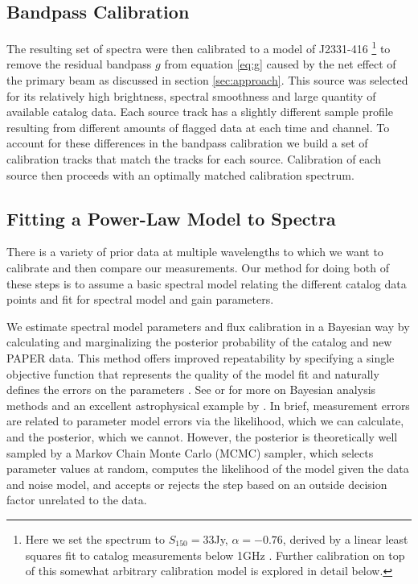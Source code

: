 \documentclass[preprint]{aastex}
\begin{document}
\subsection{Bandpass Calibration}
\label{sec:Calibration}

The resulting set of spectra were then calibrated to a model of J2331-416 
\footnote{Here we set the spectrum to $S_{150}=33$Jy, $\alpha=-0.76$, derived by a linear least squares fit to
catalog measurements below 1GHz \citep{Slee:1995p7541,Kuehr:1981p9628,Large:1981p7798,Burgess:2006p7814}.  Further calibration on top of this somewhat arbitrary calibration model
is explored in detail below. }
 to remove 
the residual bandpass $g$ from equation \ref{eq:g} caused by the net effect of the primary beam as discussed in section \ref{sec:approach}. 
This source
was selected for its relatively high brightness, spectral smoothness and large quantity
 of available catalog data. Each source track has a slightly different sample profile
 resulting from different amounts of flagged data at each time and channel. To account
 for these differences in the bandpass calibration we build a set of calibration tracks 
 that match the tracks for each source. Calibration of each source then proceeds with
 an optimally matched calibration spectrum.


\subsection{Fitting a Power-Law Model to Spectra}
\label{sec:mcmc}

There is a variety of prior data at multiple wavelengths to which we want to calibrate
and then compare our measurements.  Our method for doing both of these steps
is to assume a basic spectral model relating the different catalog data points and
fit for spectral model and gain parameters. 

We estimate spectral model parameters and flux calibration in a
Bayesian way by calculating and marginalizing the posterior probability of the
catalog and new PAPER data.   This method
offers improved repeatability by specifying a single objective function that
represents the quality of the model fit and naturally defines the errors on the
parameters \citep{Hogg:2010p8759}.   See  \citet{Mackay:2003p9717}  or
\citet{Sivia:2006p9736} for more on Bayesian analysis methods and an excellent
astrophysical example by \cite{Press:1997p9783}. In brief, measurement errors
are related to parameter model errors via the likelihood, which we can calculate, 
and the posterior, which we cannot.  However, the posterior is theoretically
well sampled by a Markov Chain Monte Carlo (MCMC) sampler, which selects parameter
values at random, computes the likelihood of the model given the data and noise model,
and accepts or rejects the step based on an outside decision factor unrelated to the data.
\end{document}
